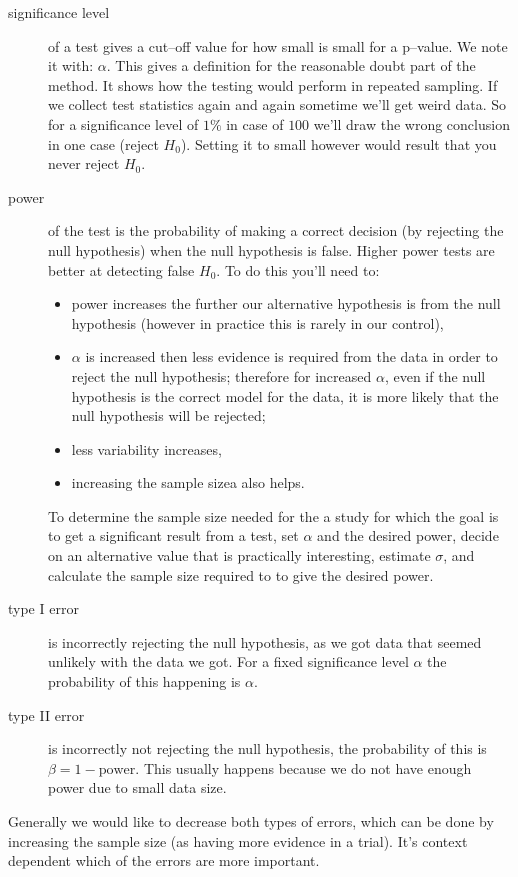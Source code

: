 \begin{description}
  \item[significance level] of a test gives a cut--off value for how small is
  small for a p--value. We note it with: $\alpha$. This gives a definition for
  the reasonable doubt part of the method. It shows how the testing would
  perform in repeated sampling. If we collect test statistics again and again
  sometime we'll get weird data. So for a significance level of $1\%$ in case of
  $100$ we'll draw the wrong conclusion in one case (reject $H_0$). Setting it
  to small however would result that you never reject $H_0$. 
  \item[power] of the test is the probability of making a correct decision (by
  rejecting the null hypothesis) when the null hypothesis is false. Higher power
  tests are better at detecting false $H_0$. To do this you'll need to:
  \begin{itemize}
  \item power increases the further our alternative hypothesis is from the null
  hypothesis (however in practice this is rarely in our control), 
  \item $\alpha$ is increased then less evidence is required from the data in
  order to reject the null hypothesis; therefore for increased $\alpha$, even if
  the null hypothesis is the correct model for the data, it is more likely that the null
  hypothesis will be rejected;
  \item less variability increases,
  \item increasing the sample sizea also helps.
\end{itemize}
 To determine the sample size needed for the a study for which the goal is to
 get a significant result from a test, set $\alpha$ and the desired power,
 decide on an alternative value that is practically interesting, estimate
 $\sigma$, and calculate the sample size required to to give the desired power.
 \item[type I error] is incorrectly rejecting the null hypothesis, as we got
 data that seemed unlikely with the data we got. For a fixed significance level
 $\alpha$ the probability of this happening is $\alpha$.
 \item[type II error] is incorrectly not rejecting the null hypothesis, the
 probability of this is $\beta = 1 - \mbox{power}$. This usually happens because
 we do not have enough power due to small data size.
\end{description}

Generally we would like to decrease both types of errors, which can be done by
increasing the sample size (as having more evidence in a trial). It's context
dependent which of the errors are more important.


